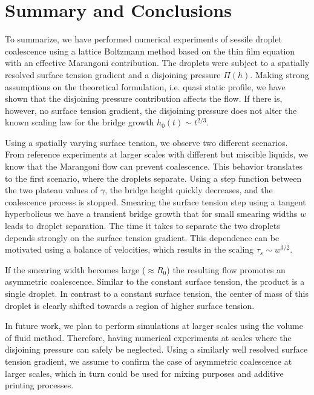 \documentclass[twocolumn,amsmath,amssymb,showpacs,nofootinbib,prfluids,superscriptaddress]{revtex4-2} %
\begin{document}
\section{Summary and Conclusions}\label{sec:sum_conclu}

To summarize, we have performed numerical experiments of sessile droplet coalescence using a lattice Boltzmann method based on the thin film equation with an effective Marangoni contribution.
The droplets were subject to a spatially resolved surface tension gradient and a disjoining pressure $\Pi(h)$.
Making strong assumptions on the theoretical formulation, i.e. quasi static profile, we have shown that the disjoining pressure contribution affects the flow.
If there is, however, no surface tension gradient, the disjoining pressure does not alter the known scaling law for the bridge growth $h_0(t) \sim t^{2/3}$.

Using a spatially varying surface tension, we observe two different scenarios.
From reference experiments at larger scales with different but miscible liquids, we know that the Marangoni flow can prevent coalescence.
This behavior translates to the first scenario, where the droplets separate.
Using a step function between the two plateau values of $\gamma$, the bridge height quickly decreases, and the coalescence process is stopped.
Smearing the surface tension step using a tangent hyperbolicus we have a transient bridge growth that for small smearing widths $w$ leads to droplet separation.
The time it takes to separate the two droplets depends strongly on the surface tension gradient.
This dependence can be motivated using a balance of velocities, which results in the scaling $\tau_s\sim w^{3/2}$.  

If the smearing width becomes large ($\approx R_0$) the resulting flow promotes an asymmetric coalescence.
Similar to the constant surface tension, the product is a single droplet.
In contrast to a constant surface tension, the center of mass of this droplet is clearly shifted towards a region of higher surface tension.

In future work, we plan to perform simulations at larger scales using the volume of fluid method.
Therefore, having numerical experiments at scales where the disjoining pressure can safely be neglected.
Using a similarly well resolved surface tension gradient, we assume to confirm the case of asymmetric coalescence at larger scales, which in turn could be used for mixing purposes and additive printing processes.
\end{document}
